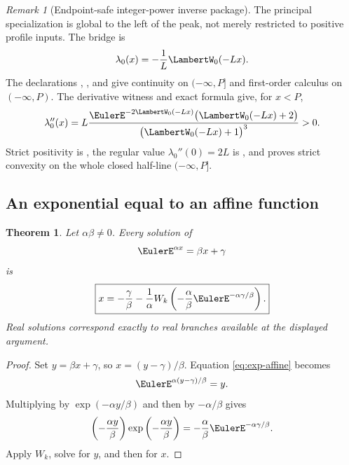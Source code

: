 \documentclass[11pt]{article}
\newtheorem{theorem}{Theorem}[section]
\theoremstyle{remark}
\newtheorem{remark}[remark]{Remark}
\newcommand{\Wz}{\LambertW_{0}}
\begin{document}
\begin{remark}[Endpoint-safe integer-power inverse package]
The principal specialization is global to the left of the peak, not merely
restricted to positive profile inputs.  The bridge
 is
\[
 \lambda_0(x)=-\frac1L\Wz(-Lx).
\]
The declarations ,
, and
 give continuity on
\((-\infty,P]\) and first-order calculus on \((-\infty,P)\).
The derivative witness
 and exact formula
 give, for \(x<P\),
\begin{equation}\label{eq:fabius-principal-phase-second-derivative}
 \lambda_0''(x)
 =L\frac{\EulerE^{-2\Wz(-Lx)}\bigl(\Wz(-Lx)+2\bigr)}
          {\bigl(\Wz(-Lx)+1\bigr)^3}>0.
\end{equation}
Strict positivity is
, the regular value
\(\lambda_0''(0)=2L\) is
, and
 proves strict convexity on
the whole closed half-line \((-\infty,P]\).
\end{remark}

\subsection{An exponential equal to an affine function}

\begin{theorem}\label{thm:exp-affine}
Let \(\alpha\beta\neq0\).  Every solution of
\begin{equation}\label{eq:exp-affine}
       \EulerE^{\alpha x}=\beta x+\gamma
\end{equation}
is
\begin{equation}\label{eq:exp-affine-sol}
 \boxed{\displaystyle
 x=-\frac{\gamma}{\beta}
   -\frac1\alpha
 W_k\left(
  -\frac{\alpha}{\beta}
  \EulerE^{-\alpha\gamma/\beta}
 \right).}
\end{equation}
Real solutions correspond exactly to real branches available at the
displayed argument.
\end{theorem}

\begin{proof}
Set \(y=\beta x+\gamma\), so \(x=(y-\gamma)/\beta\).  Equation
\eqref{eq:exp-affine} becomes
\[
       \EulerE^{\alpha(y-\gamma)/\beta}=y.
\]
Multiplying by \(\exp(-\alpha y/\beta)\) and then by
\(-\alpha/\beta\) gives
\[
 \left(-\frac{\alpha y}{\beta}\right)
 \exp\left(-\frac{\alpha y}{\beta}\right)
 =
 -\frac{\alpha}{\beta}\EulerE^{-\alpha\gamma/\beta}.
\]
Apply \(W_k\), solve for \(y\), and then for \(x\).
\end{proof}
\end{document}
